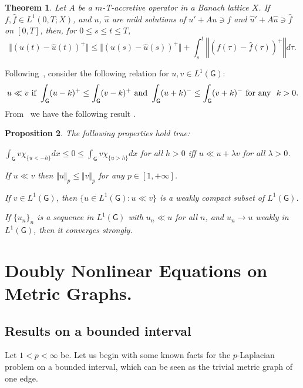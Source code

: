\documentclass[reqno,12pt]{amsart}
\newtheorem{theorem}{Theorem}[section]
\newtheorem{proposition}[theorem]{Proposition}
\newcommand{\norm}[1]{\left\Vert #1 \right\Vert} %
\newcommand{\G}{\mathsf{G}}	%
\numberwithin{equation}{section} %
\begin{document}
 \begin{theorem}\label{ContPrinTT} Let $A$
 be a $m$-T-accretive operator in a Banach lattice $X$. If $f, \hat f \in L^1(0, T; X)$, and $u$, $\hat u$
  are mild solutions of $u' + A u \ni f$ and $\hat{u}' + A \hat{u} \ni
  \hat{f}$ on $[0, T]$, then, for $0\leq s \leq t \leq T$,
  $$\Vert (u(t) - \hat{u}(t))^+ \Vert \leq \Vert (u(s) - \hat{u}(s))^+
  \Vert + \int_s^t \norm{ (f(\tau) - \hat{f}(\tau))^+} d \tau.$$
\end{theorem}
 

 

 Following~\cite{BenCra91}, consider the following relation for $u,v \in L^1(\G)$: 
$$u\ll v   \hbox{ if }   \int_\G (u - k)^+ \leq \int_\G (v - k)^+   \hbox{ and }    \int_\G (u +k)^- \leq \int_\G (v + k)^-    \hbox{ for any } \ k >0.$$
From~\cite{BenCra91}  we have  the following result .
\begin{proposition}\label{inq1BC}  The following properties hold true:
\item[\ \ (1)] $\displaystyle \int_\G v\chi_{\{u<-h\}}dx\le 0\le  \int_\G v\chi_{\{u>h\}}dx$ for all $h>0$ iff 
$u\ll u+\lambda v$ for all $\lambda>0$. 
\item[\ \ (2)] If  $u \ll v$  then $\Vert u \Vert_p \leq \Vert v \Vert_p $ for any $p \in [1,+\infty]$.
\item[\ \ (3)] If $v \in L^1(\G)$, then $\{ u \in L^1(\G)  :  u \ll v \}$ is a weakly compact subset of $L^1(\G)$.
\item[\ \ (4)] If $\{u_n\}_n$ is a sequence in $L^1(\G)$ with $u_n\ll u$ for all $n$, and $u_n\to u$ weakly in $L^1(\G)$, then it converges strongly.
\end{proposition}
 

 


\section{Doubly Nonlinear  Equations  on Metric Graphs. }\label{sec23}

\subsection{Results on a bounded interval}
Let $1 < p < \infty$ be. Let us begin with some known facts for the $p$-Laplacian problem on a bounded interval,  which can be seen as the trivial metric graph of one edge.  
\end{document}

